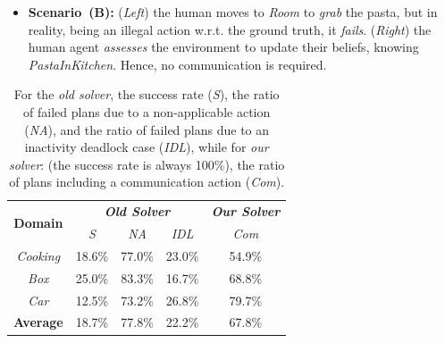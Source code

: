 \documentclass[letterpaper]{article} %
\begin{document}
\begin{itemize}
    \item
    \textbf{Scenario~(B):}
    (\textit{Left}) the human moves to \textit{Room} to \textit{grab} the pasta, but in reality, being an illegal action w.r.t. 
    the ground truth, it \textit{fails}. 
    (\textit{Right}) the human agent \textit{assesses} the environment to update their beliefs, knowing \textit{PastaInKitchen}. 
    Hence, no communication is required.
\end{itemize}

\begin{table}
    \begin{adjustbox}{width=0.77\columnwidth,center}
    \begin{tabular}{@{}c|r r r| c@{}}
        \multirow{2}{*}{
        \textbf{Domain}} & \multicolumn{3}{c|}{\textbf{\textit{Old Solver}}} & \multicolumn{1}{c}{\textbf{\textit{Our Solver}}}
        \\
        & \multicolumn{1}{c}{\textit{S}} & \multicolumn{1}{c}{\textit{NA}} & \multicolumn{1}{c|}{\textit{IDL}} & \multicolumn{1}{c}{\textit{Com}} 
        \\ \cline{1-5}
        \textit{Cooking} & 18.6\% & 77.0\% & 23.0\%  & 54.9\%\\
        \textit{Box} & 25.0\% & 83.3\% & 16.7\%  & 68.8\%\\
        \textit{Car} & 12.5\% & 73.2\% & 26.8\%  & 79.7\%\\
        \hline
        \textbf{Average} & 18.7\% & 77.8\% & 22.2\%  & 67.8\%\\
    \end{tabular}
    \end{adjustbox}
    \caption
    {
    \label{tab:q_results}
    For the \textit{old solver}, the success rate (\textit{S}), the ratio of failed plans due to a non-applicable action (\textit{NA}), and the ratio of failed plans due to an inactivity deadlock case (\textit{IDL}), while for \textit{our solver}: (the success rate is always 100\%), the ratio of plans including a communication action (\textit{Com}).
    }
\end{table}
\end{document}

